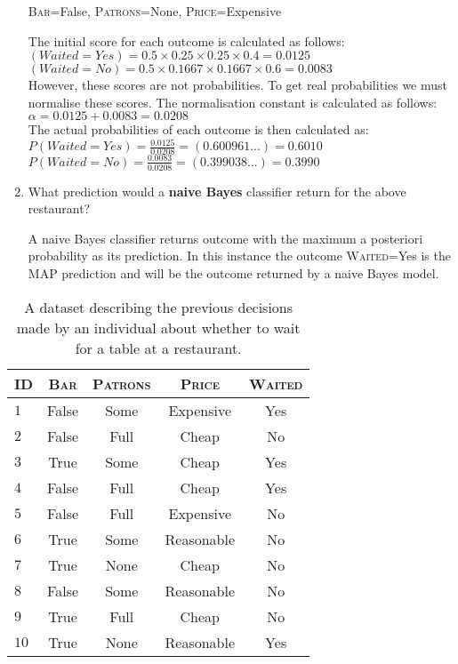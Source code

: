 \documentclass[nosolution]{ditpaper}
\begin{document}
\begin{enumerate}
		\begin{center}
		\textsc{Bar}=False, \textsc{Patrons}=None, \textsc{Price}=Expensive
		\end{center}
		\begin{answer}
		The initial score for each outcome is calculated as follows:\\
		$(Waited=Yes) =  0.5 \times 0.25 \times 0.25 \times 0.4 = 0.0125$\\
		$(Waited=No) =  0.5 \times 0.1667 \times 0.1667 \times 0.6 = 0.0083$\\
		However, these scores are not probabilities. To get real probabilities we must normalise these scores. The normalisation constant is calculated as follows:\\
		$\alpha=0.0125+0.0083=0.0208$\\
		The actual probabilities of each outcome is then calculated as:
		$P(Waited=Yes) =  \frac{0.0125}{0.0208}=(0.600961...)=0.6010$ \\
		$P(Waited=No) =  \frac{0.0083}{0.0208}=(0.399038...)=0.3990$\\
		\end{answer}
		\item What prediction would a \textbf{naive Bayes} classifier return for the 	above restaurant?			
		\begin{answer}
		A naive Bayes classifier returns outcome with the maximum a posteriori probability as its prediction. In this instance the outcome \textsc{Waited}=Yes is the MAP prediction and will be the outcome returned by a naive Bayes model.
		\end{answer} 
\end{enumerate}
\begin{table}[h]
\begin{center}
\caption{A dataset describing the previous decisions made by an individual about whether to wait for a table at a restaurant.}
\label{tab:rest}
\vspace{0.5em}
\begin{tabular}{lcccc}
\hline
 ID & \textsc{Bar} & \textsc{Patrons} & \textsc{Price} & \textsc{Waited} \\
\hline
$1$  & False & Some & Expensive &  Yes\\
$2$    & False & Full & Cheap &   No\\
$3$    & True & Some & Cheap &   Yes\\
$4$    & False & Full & Cheap &   Yes\\
$5$    & False & Full & Expensive &   No\\
$6$    & True & Some & Reasonable &   No\\
$7$    & True & None & Cheap &   No\\
$8$    & False & Some & Reasonable &   No\\
$9$     & True & Full & Cheap &   No\\
$10$ & True & None & Reasonable &   Yes\\
\hline
\end{tabular}
\end{center}
\end{table}
\end{document}
